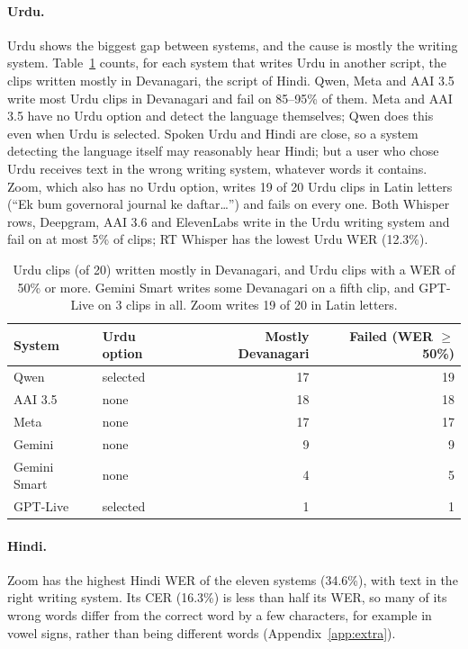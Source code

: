 \documentclass[11pt]{article}
\begin{document}
\paragraph{Urdu.} Urdu shows the biggest gap between systems, and the cause is mostly the writing system. Table~\ref{tab:urdu} counts, for each system that writes Urdu in another script, the clips written mostly in Devanagari, the script of Hindi. Qwen, Meta and AAI 3.5 write most Urdu clips in Devanagari and fail on 85--95\% of them. Meta and AAI 3.5 have no Urdu option and detect the language themselves; Qwen does this even when Urdu is selected. Spoken Urdu and Hindi are close, so a system detecting the language itself may reasonably hear Hindi; but a user who chose Urdu receives text in the wrong writing system, whatever words it contains. Zoom, which also has no Urdu option, writes 19 of 20 Urdu clips in Latin letters (``Ek bum governoral journal ke daftar\ldots'') and fails on every one. Both Whisper rows, Deepgram, AAI 3.6 and ElevenLabs write in the Urdu writing system and fail on at most 5\% of clips; RT Whisper has the lowest Urdu WER (12.3\%).

\begin{table}[!htbp]
\centering\small
\begin{tabular}{@{}llrr@{}}
\toprule
System & Urdu option & Mostly Devanagari & Failed (WER $\geq$50\%) \\
\midrule
Qwen & selected & 17 & 19 \\
AAI 3.5 & none & 18 & 18 \\
Meta & none & 17 & 17 \\
Gemini & none & 9 & 9 \\
Gemini Smart & none & 4 & 5 \\
GPT-Live & selected & 1 & 1 \\
\bottomrule
\end{tabular}
\caption{Urdu clips (of 20) written mostly in Devanagari, and Urdu clips with a WER of 50\% or more. Gemini Smart writes some Devanagari on a fifth clip, and GPT-Live on 3 clips in all. Zoom writes 19 of 20 in Latin letters.}
\label{tab:urdu}
\end{table}

\paragraph{Hindi.} Zoom has the highest Hindi WER of the eleven systems (34.6\%), with text in the right writing system. Its CER (16.3\%) is less than half its WER, so many of its wrong words differ from the correct word by a few characters, for example in vowel signs, rather than being different words (Appendix~\ref{app:extra}).
\end{document}
